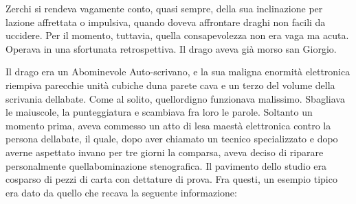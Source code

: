 	Zerchi si rendeva vagamente conto, quasi sempre, della sua inclinazione
	per l\textquotesingle azione affrettata o impulsiva, quando doveva
	affrontare draghi non facili da uccidere. Per il momento, tuttavia,
	quella consapevolezza non era vaga ma acuta. Operava in una sfortunata
	retrospettiva. Il drago aveva già morso san Giorgio.
	
	Il drago era un Abominevole Auto-scrivano, e la sua maligna enormità
	elettronica riempiva parecchie unità cubiche d\textquotesingle una
	parete cava e un terzo del volume della scrivania
	dell\textquotesingle abate. Come al solito,
	quell\textquotesingle ordigno funzionava malissimo. Sbagliava le
	maiuscole, la punteggiatura e scambiava fra loro le parole. Soltanto un
	momento prima, aveva commesso un atto di lesa maestà elettronica contro
	la persona dell\textquotesingle abate, il quale, dopo aver chiamato un
	tecnico specializzato e dopo averne aspettato invano per tre giorni la
	comparsa, aveva deciso di riparare personalmente
	quell\textquotesingle abominazione stenografica. Il pavimento dello
	studio era cosparso di pezzi di carta con dettature di prova. Fra
	questi, un esempio tipico era dato da quello che recava la seguente
	informazione:
	
	\begin{center}
	\end{center}
	\leavevmode\\
	
